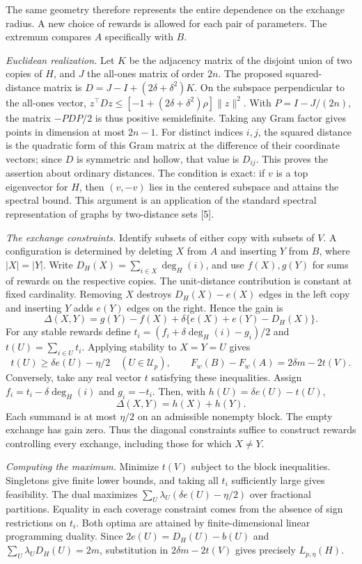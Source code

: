 \documentclass[11pt]{article}
\begin{document}
The same geometry therefore represents the entire dependence on the exchange radius. A new choice of rewards is allowed for each pair of parameters. The extremum compares $A$ specifically with $B$.

\textit{Euclidean realization.} Let $K$ be the adjacency matrix of the disjoint union of two copies of $H$, and $J$ the all-ones matrix of order $2n$. The proposed squared-distance matrix is $D=J-I+(2\delta+\delta^2)K$. On the subspace perpendicular to the all-ones vector, $z^\top Dz\le[-1+(2\delta+\delta^2)\rho]\|z\|^2$. With $P=I-J/(2n)$, the matrix $-PDP/2$ is thus positive semidefinite. Taking any Gram factor gives points in dimension at most $2n-1$. For distinct indices $i,j$, the squared distance is the quadratic form of this Gram matrix at the difference of their coordinate vectors; since $D$ is symmetric and hollow, that value is $D_{ij}$. This proves the assertion about ordinary distances. The condition is exact: if $v$ is a top eigenvector for $H$, then $(v,-v)$ lies in the centered subspace and attains the spectral bound. This argument is an application of the standard spectral representation of graphs by two-distance sets [5].

\textit{The exchange constraints.} Identify subsets of either copy with subsets of $V$. A configuration is determined by deleting $X$ from $A$ and inserting $Y$ from $B$, where $|X|=|Y|$. Write $D_H(X)=\sum_{i\in X}\deg_H(i)$, and use $f(X),g(Y)$ for sums of rewards on the respective copies. The unit-distance contribution is constant at fixed cardinality. Removing $X$ destroys $D_H(X)-e(X)$ edges in the left copy and inserting $Y$ adds $e(Y)$ edges on the right. Hence the gain is
\[
 \Delta(X,Y)=g(Y)-f(X)+\delta\{e(X)+e(Y)-D_H(X)\}.
\]
For any stable rewards define $t_i=(f_i+\delta\deg_H(i)-g_i)/2$ and $t(U)=\sum_{i\in U}t_i$. Applying stability to $X=Y=U$ gives
\[
 t(U)\ge\delta e(U)-\eta/2 \quad(U\in\mathcal U_p),\qquad
 F_w(B)-F_w(A)=2\delta m-2t(V).
\]
Conversely, take any real vector $t$ satisfying these inequalities. Assign $f_i=t_i-\delta\deg_H(i)$ and $g_i=-t_i$. Then, with $h(U)=\delta e(U)-t(U)$,
\[
                     \Delta(X,Y)=h(X)+h(Y).
\]
Each summand is at most $\eta/2$ on an admissible nonempty block. The empty exchange has gain zero. Thus the diagonal constraints suffice to construct rewards controlling every exchange, including those for which $X\ne Y$.

\textit{Computing the maximum.} Minimize $t(V)$ subject to the block inequalities. Singletons give finite lower bounds, and taking all $t_i$ sufficiently large gives feasibility. The dual maximizes $\sum_U\lambda_U(\delta e(U)-\eta/2)$ over fractional partitions. Equality in each coverage constraint comes from the absence of sign restrictions on $t_i$. Both optima are attained by finite-dimensional linear programming duality. Since $2e(U)=D_H(U)-b(U)$ and $\sum_U\lambda_U D_H(U)=2m$, substitution in $2\delta m-2t(V)$ gives precisely $L_{p,\eta}(H)$.
\end{document}
